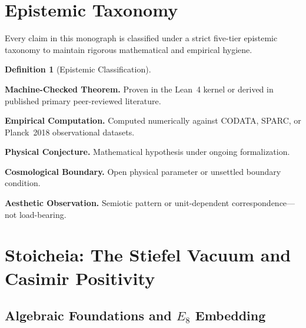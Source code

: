 \documentclass[12pt,letterpaper]{article}
\theoremstyle{plain}
\theoremstyle{definition}
\newtheorem{definition}[theorem]{Definition}
\begin{document}
\section{Epistemic Taxonomy}
\label{sec:taxonomy}

Every claim in this monograph is classified under a strict five-tier epistemic taxonomy to maintain rigorous mathematical and empirical hygiene.

\begin{definition}[Epistemic Classification]\label{def:tags}
\begin{enumerate}[label=\textbf{[\alph*]},leftmargin=2.3cm]
  \item[\textbf{[thm]}] \textbf{Machine-Checked Theorem.} Proven in the Lean~4 kernel or derived in published primary peer-reviewed literature.
  \item[\textbf{[emp]}] \textbf{Empirical Computation.} Computed numerically against CODATA, SPARC, or Planck~2018 observational datasets.
  \item[\textbf{[conj]}] \textbf{Physical Conjecture.} Mathematical hypothesis under ongoing formalization.
  \item[\textbf{[open]}] \textbf{Cosmological Boundary.} Open physical parameter or unsettled boundary condition.
  \item[\textbf{[note]}] \textbf{Aesthetic Observation.} Semiotic pattern or unit-dependent correspondence---not load-bearing.
\end{enumerate}
\end{definition}

\section{Stoicheia: The Stiefel Vacuum and Casimir Positivity}
\label{sec:stoicheia}

\subsection{Algebraic Foundations and $E_8$ Embedding}
\end{document}
